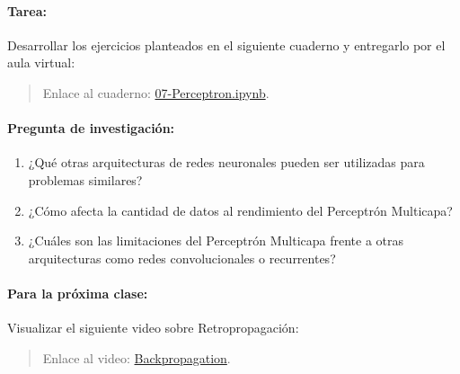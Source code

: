 \documentclass[a4,11pt]{aleph-notas}
\begin{document}
\paragraph{Tarea:}
Desarrollar los ejercicios planteados en el siguiente cuaderno y entregarlo por el aula virtual:
\begin{quote}
    Enlace al cuaderno: \href{https://colab.research.google.com/github/andres-merino/AprendizajeAutomaticoInicial-05-N0105/blob/main/2-Ejercicios/07-Perceptron.ipynb}{07-Perceptron.ipynb}.
\end{quote}

\paragraph{Pregunta de investigación:}  
\begin{enumerate}[leftmargin=*]
    \item ¿Qué otras arquitecturas de redes neuronales pueden ser utilizadas para problemas similares?
    \item ¿Cómo afecta la cantidad de datos al rendimiento del Perceptrón Multicapa?
    \item ¿Cuáles son las limitaciones del Perceptrón Multicapa frente a otras arquitecturas como redes convolucionales o recurrentes?
\end{enumerate}

\paragraph{Para la próxima clase:}  
Visualizar el siguiente video sobre Retropropagación:
\begin{quote}
    Enlace al video: \href{https://youtu.be/eNIqz_noix8?si=RzQqVstBn3TFKDk7}{Backpropagation}.
\end{quote}
\end{document}
